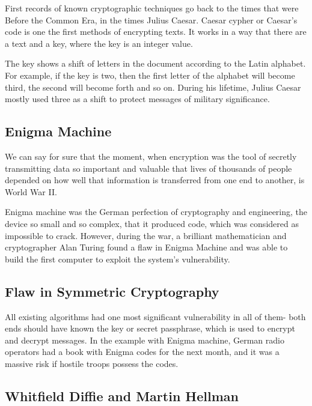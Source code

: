 \documentclass[a4paper, 12pt]{article}
\begin{document}
First records of known cryptographic techniques go back to the times that were Before the
Common Era, in the times Julius Caesar. Caesar cypher or Caesar's code is one the first methods
of encrypting texts. It works in a way that there are a text and a key, where the key is an integer value.

The key shows a shift of letters in the document according to the Latin alphabet. For example, if
the key is two, then the first letter of the alphabet will become third, the second will become forth
and so on. During his lifetime, Julius Caesar mostly used three as a shift to protect messages of
military significance.\cite{singh}

\subsection{Enigma Machine}
\label{bsec:enigma_machine}

We can say for sure that the moment, when encryption was the tool of secretly transmitting data
so important and valuable that lives of thousands of people depended on how well that information
is transferred from one end to another, is World War II.

Enigma machine was the German
perfection of cryptography and engineering, the device so small and so complex, that it produced
code, which was considered as impossible to crack. However, during the war, a brilliant
mathematician and cryptographer Alan Turing found a flaw in Enigma Machine and was able to
build the first computer to exploit the system's vulnerability\cite{enigma}.

\subsection{Flaw in Symmetric Cryptography}
\label{bsec:flaw}

All existing algorithms had one most significant vulnerability in all of them- both ends should have
known the key or secret passphrase, which is used to encrypt and decrypt messages. In the example
with Enigma machine, German radio operators had a book with Enigma codes for the next month,
and it was a massive risk if hostile troops possess the codes. 

\subsection{Whitfield Diffie and Martin Hellman}
\label{bsec:diffie}
\end{document}
